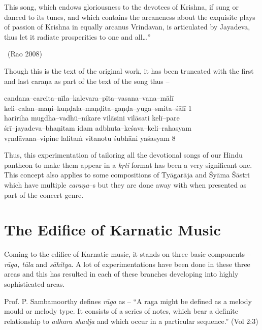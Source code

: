 \newpage

\begin{myquote}
This song, which endows gloriousness to the devotees of Krishna, if sung or danced to its tunes, and which contains the arcaneness about the exquisite plays of passion of Krishna in equally arcanus Vrindavan, is articulated by Jayadeva, thus let it radiate prosperities to one and all…” 

~\hfill (Rao 2008)
\end{myquote}

Though this is the text of the original work, it has been truncated with the first and last caraṇa as part of the text of the song thus –

\begin{myquote}
candana–carcita–nīla–kalevara–pīta–vasana–vana–mālī \\ keli–calan–maṇi–kuṇḍala–maṇḍita–gaṇḍa–yuga–smita–śālī  1 \\ haririha mugdha–vadhū–nikare vilāsini vilāsati kelī–pare\\ śrī–jayadeva–bhaṇitam idam adbhuta–keśava–keli–rahasyam  \\ vṛndāvana–vipine lalitaṁ vitanotu śubhāni yaśasyam  8 
\end{myquote}

Thus, this experimentation of tailoring all the devotional songs of our Hindu pantheon to make them appear in a \textit{kṛti} format has been a very significant one. This concept also applies to some compositions of Tyāgarāja and Śyāma Śāstri which have multiple \textit{caraṇa}–s but they are done away with when presented as part of the concert genre.

\vspace{-.3cm}

\section*{The Edifice of Karnatic Music}

Coming to the edifice of Karnatic music, it stands on three basic components – \textit{rāga, tāla} and \textit{sāhitya}. A lot of experimentations have been done in these three areas and this has resulted in each of these branches developing into highly sophisticated areas.

Prof. P. Sambamoorthy defines \textit{rāga} as – “A raga might be defined as a melody mould or melody type. It consists of a series of notes, which bear a definite relationship to \textit{adhara shadja} and which occur in a particular sequence.” (Vol 2:3)

